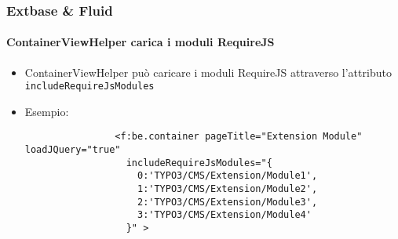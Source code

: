 
\begin{frame}[fragile]
	\frametitle{Extbase \& Fluid}
	\framesubtitle{ContainerViewHelper carica i moduli RequireJS}

	\begin{itemize}

		\item ContainerViewHelper può caricare i moduli RequireJS attraverso l'attributo \texttt{includeRequireJsModules}

		\item Esempio:

			\begin{lstlisting}
				<f:be.container pageTitle="Extension Module" loadJQuery="true"
				  includeRequireJsModules="{
				    0:'TYPO3/CMS/Extension/Module1',
				    1:'TYPO3/CMS/Extension/Module2',
				    2:'TYPO3/CMS/Extension/Module3',
				    3:'TYPO3/CMS/Extension/Module4'
				  }" >
			\end{lstlisting}

	\end{itemize}

\end{frame}


